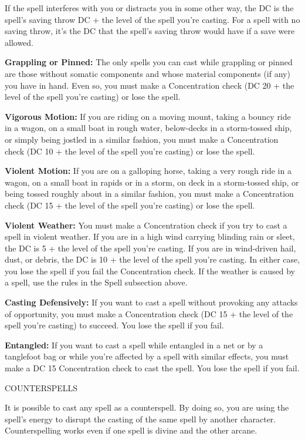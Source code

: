 \documentclass{article}
\begin{document}
If the spell interferes with you or distracts you in some other way, the DC is 
the spell's saving throw DC + the level of the spell you're casting. For a spell 
with no saving throw, it's the DC that the spell's saving throw would have if a 
save were allowed.

\textbf{Grappling or Pinned:} The only spells you can cast while grappling or pinned 
are those without somatic components and whose material components (if any) you 
have in hand. Even so, you must make a Concentration check (DC 20 + the level of 
the spell you're casting) or lose the spell.

\textbf{Vigorous Motion:} If you are riding on a moving mount, taking a bouncy 
ride in a wagon, on a small boat in rough water, below-decks in a storm-tossed 
ship, or simply being jostled in a similar fashion, you must make a Concentration 
check (DC 10 + the level of the spell you're casting) or lose the spell. 

\textbf{Violent Motion: }If you are on a galloping horse, taking a very rough ride 
in a wagon, on a small boat in rapids or in a storm, on deck in a storm-tossed 
ship, or being tossed roughly about in a similar fashion, you must make a Concentration 
check (DC 15 + the level of the spell you're casting) or lose the spell.

\textbf{Violent Weather: }You must make a Concentration check if you try to cast 
a spell in violent weather. If you are in a high wind carrying blinding rain or 
sleet, the DC is 5 + the level of the spell you're casting. If you are in wind-driven 
hail, dust, or debris, the DC is 10 + the level of the spell you're casting. In 
either case, you lose the spell if you fail the Concentration check. If the weather 
is caused by a spell, use the rules in the Spell subsection above.

\textbf{Casting Defensively:} If you want to cast a spell without provoking any 
attacks of opportunity, you must make a Concentration check (DC 15 + the level 
of the spell you're casting) to succeed. You lose the spell if you fail.

\textbf{Entangled:} If you want to cast a spell while entangled in a net or by 
a tanglefoot bag or while you're affected by a spell with similar effects, you 
must make a DC 15 Concentration check to cast the spell. You lose the spell if 
you fail.

\vspace{12pt}
COUNTERSPELLS

It is possible to cast any spell as a counterspell. By doing so, you are using 
the spell's energy to disrupt the casting of the same spell by another character. 
Counterspelling works even if one spell is divine and the other arcane.
\end{document}

